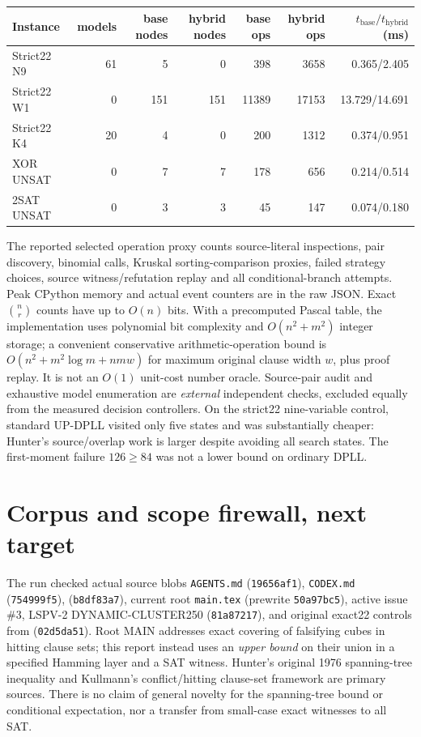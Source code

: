 \documentclass[11pt]{article}
\begin{document}
\begin{center}\small\begin{tabular}{@{}lrrrrrr@{}}\toprule
Instance & models & base nodes & hybrid nodes & base ops & hybrid ops & $t_{\mathrm{base}}/t_{\mathrm{hybrid}}$ (ms)\\\midrule
Strict22 N9 & 61 & 5 & 0 & 398 & 3658 & 0.365/2.405 \\
Strict22 W1 & 0 & 151 & 151 & 11389 & 17153 & 13.729/14.691 \\
Strict22 K4 & 20 & 4 & 0 & 200 & 1312 & 0.374/0.951 \\
XOR UNSAT & 0 & 7 & 7 & 178 & 656 & 0.214/0.514 \\
2SAT UNSAT & 0 & 3 & 3 & 45 & 147 & 0.074/0.180 \\
\bottomrule\end{tabular}\end{center}
The reported selected operation proxy counts source-literal inspections, pair discovery, binomial calls, Kruskal sorting-comparison proxies, failed strategy choices, source witness/refutation replay and all conditional-branch attempts. Peak CPython memory and actual event counters are in the raw JSON. Exact $\binom nr$ counts have up to $O(n)$ bits. With a precomputed Pascal table, the implementation uses polynomial bit complexity and $O(n^2+m^2)$ integer storage; a convenient conservative arithmetic-operation bound is $O(n^2+m^2\log m+nmw)$ for maximum original clause width $w$, plus proof replay. It is not an $O(1)$ unit-cost number oracle. Source-pair audit and exhaustive model enumeration are \emph{external} independent checks, excluded equally from the measured decision controllers. On the strict22 nine-variable control, standard UP-DPLL visited only five states and was substantially cheaper: Hunter's source/overlap work is larger despite avoiding all search states. The first-moment failure $126\ge84$ was not a lower bound on ordinary DPLL.

\section{Corpus and scope firewall, next target}
The run checked actual source blobs \texttt{AGENTS.md} (\texttt{19656af1}), \texttt{CODEX.md} (\texttt{754999f5}),  (\texttt{b8df83a7}), current root \texttt{main.tex} (prewrite \texttt{50a97bc5}), active issue \#3, LSPV-2 DYNAMIC-CLUSTER250 (\texttt{81a87217}), and original exact22 controls from  (\texttt{02d5da51}). Root MAIN  addresses exact covering of falsifying cubes in hitting clause sets; this report instead uses an \emph{upper bound} on their union in a specified Hamming layer and a SAT witness. Hunter's original 1976 spanning-tree inequality \cite{Hunter1976} and Kullmann's conflict/hitting clause-set framework \cite{Kullmann2003,Kullmann2011} are primary sources. There is no claim of general novelty for the spanning-tree bound or conditional expectation, nor a transfer from small-case exact witnesses to all SAT.
\end{document}
